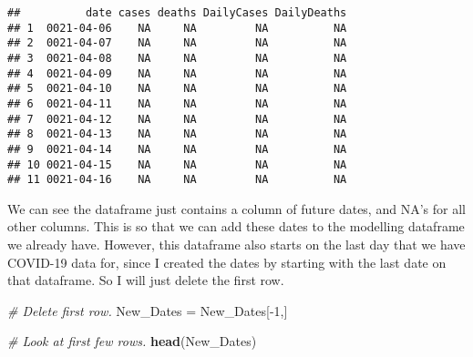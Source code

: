 \documentclass[]{tufte-handout}
\newenvironment{Shaded}{}{}
\newcommand{\CommentTok}[1]{\textcolor[rgb]{0.38,0.63,0.69}{\textit{#1}}}
\newcommand{\DataTypeTok}[1]{\textcolor[rgb]{0.56,0.13,0.00}{#1}}
\newcommand{\DecValTok}[1]{\textcolor[rgb]{0.25,0.63,0.44}{#1}}
\newcommand{\KeywordTok}[1]{\textcolor[rgb]{0.00,0.44,0.13}{\textbf{#1}}}
\newcommand{\NormalTok}[1]{#1}
\newcommand{\OperatorTok}[1]{\textcolor[rgb]{0.40,0.40,0.40}{#1}}
\newcommand{\OtherTok}[1]{\textcolor[rgb]{0.00,0.44,0.13}{#1}}
\newcommand{\StringTok}[1]{\textcolor[rgb]{0.25,0.44,0.63}{#1}}
\begin{document}
\begin{Shaded}
\end{Shaded}

\begin{verbatim}
##          date cases deaths DailyCases DailyDeaths
## 1  0021-04-06    NA     NA         NA          NA
## 2  0021-04-07    NA     NA         NA          NA
## 3  0021-04-08    NA     NA         NA          NA
## 4  0021-04-09    NA     NA         NA          NA
## 5  0021-04-10    NA     NA         NA          NA
## 6  0021-04-11    NA     NA         NA          NA
## 7  0021-04-12    NA     NA         NA          NA
## 8  0021-04-13    NA     NA         NA          NA
## 9  0021-04-14    NA     NA         NA          NA
## 10 0021-04-15    NA     NA         NA          NA
## 11 0021-04-16    NA     NA         NA          NA
\end{verbatim}

We can see the dataframe just contains a column of future dates, and
NA's for all other columns. This is so that we can add these dates to
the modelling dataframe we already have. However, this dataframe also
starts on the last day that we have COVID-19 data for, since I created
the dates by starting with the last date on that dataframe. So I will
just delete the first row.

\begin{Shaded}
\begin{Highlighting}[]
\CommentTok{# Delete first row.}
\NormalTok{New_Dates =}\StringTok{ }\NormalTok{New_Dates[}\OperatorTok{-}\DecValTok{1}\NormalTok{,]}

\CommentTok{# Look at first few rows.}
\KeywordTok{head}\NormalTok{(New_Dates)}
\end{Highlighting}
\end{Shaded}
\end{document}
